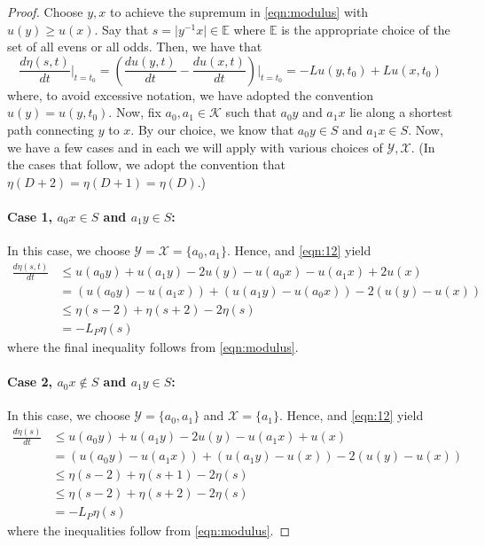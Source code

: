 \begin{proof}
 Choose $y,x$ to achieve the supremum in \cref{eqn:modulus} with $u(y) \geq u(x)$. Say that $s=\lvert y^{-1} x \rvert \in \mathbb{E}$ where $\mathbb{E}$ is the appropriate choice of the set of all evens or all odds. Then, we have that
    \begin{equation}\label{eqn:12}
        \frac{d \eta(s,t)}{dt}\bigg\rvert_{t=t_0} = \left(\frac{d u(y,t)}{dt}-\frac{d u(x,t)}{dt}\right)\bigg\rvert_{t=t_0} = -Lu(y,t_0)+Lu(x,t_0)
    \end{equation}
    where, to avoid excessive notation, we have adopted the convention $u(y)=u(y,t_0)$. Now, fix $a_0,a_1 \in \mathcal{K}$ such that $a_0 y$ and $a_1 x$ lie along a shortest path connecting $y$ to $x$. 
By our choice, we know that $a_0 y \in S$ and $a_1 x \in S$. Now, we have a few cases and in each we will apply  with various choices of $\mathcal{Y},\mathcal{X}$. (In the cases that follow, we adopt the convention that $\eta(D+2)=\eta(D+1)=\eta(D)$.) 
\paragraph{Case 1, $a_0x \in S$ and $a_1 y \in S$:} In this case, we choose $\mathcal{Y}=\mathcal{X}=\{a_0,a_1\}$. Hence,  and \cref{eqn:12} yield
    \begin{align*}
        \frac{d \eta(s,t)}{dt} &\leq u(a_0y) + u(a_1y)-2u(y) - u(a_0x) -u(a_1x)+2u(x) \\
        &= \left(u(a_0y)-u(a_1x)\right) + \left(u(a_1y)-u(a_0x)\right) - 2 \left(u(y)-u(x)\right) \\
        &\leq \eta(s-2) + \eta(s+2) -2 \eta(s) \\
        &= - L_P\eta(s) 
    \end{align*}
    where the final inequality follows from \cref{eqn:modulus}.
\paragraph{Case 2, $a_0x \notin S$ and $a_1y \in S$:} In this case, we choose $\mathcal{Y}=\{a_0,a_1\}$ and $\mathcal{X}=\{a_1\}$. Hence,  and \cref{eqn:12} yield
	\begin{align*}
        \frac{d \eta(s)}{dt} &\leq u(a_0y) + u(a_1y)-2u(y) - u(a_1x) + u(x) \\
        &= \left(u(a_0y)-u(a_1x)\right) + \left(u(a_1y)-u(x)\right) - 2 \left(u(y)-u(x)\right) \\
        &\leq \eta(s-2) + \eta(s+1) -2 \eta(s) \\
        &\leq \eta(s-2) + \eta(s+2) - 2 \eta(s)\\
        &= - L_P\eta(s)
    \end{align*}
    where the inequalities follow from \cref{eqn:modulus}.

\end{proof}
